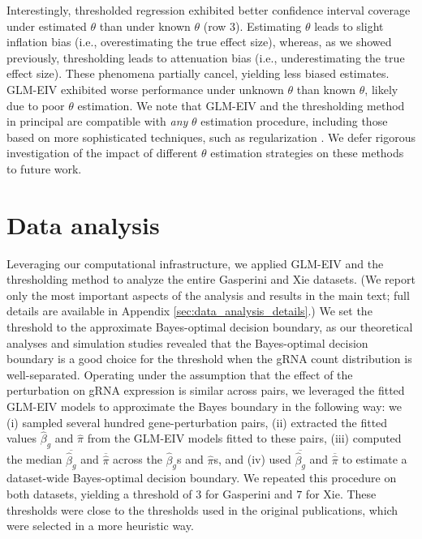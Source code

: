 \documentclass[12pt]{article}
\begin{document}
Interestingly, thresholded regression exhibited better confidence interval coverage under estimated $\theta$ than under known $\theta$ (row 3). Estimating $\theta$ leads to slight inflation bias (i.e., overestimating the true effect size), whereas, as we showed previously, thresholding leads to attenuation bias (i.e., underestimating the true effect size). These phenomena partially cancel, yielding less biased estimates. GLM-EIV exhibited worse performance under unknown $\theta$ than known $\theta$, likely due to poor $\theta$ estimation. We note that GLM-EIV and the thresholding method in principal are compatible with \textit{any} $\theta$ estimation procedure, including those based on more sophisticated techniques, such as regularization \cite{Hafemeister2019}. We defer rigorous investigation of the impact of different $\theta$ estimation strategies on these methods to future work.

\section{Data analysis}

Leveraging our computational infrastructure, we applied GLM-EIV and the thresholding method to analyze the entire Gasperini and Xie datasets. (We report only the most important aspects of the analysis and results in the main text; full details are available in Appendix \ref{sec:data_analysis_details}.) We set the threshold to the approximate Bayes-optimal decision boundary, as our theoretical analyses and simulation studies revealed that the Bayes-optimal decision boundary is a good choice for the threshold when the gRNA count distribution is well-separated. Operating under the assumption that the effect of the perturbation on gRNA expression is similar across pairs, we leveraged the fitted GLM-EIV models to approximate the Bayes boundary in the following way: we (i) sampled several hundred gene-perturbation pairs, (ii) extracted the fitted values $\hat{\beta}_g$ and $\hat{\pi}$ from the GLM-EIV models fitted to these pairs, (iii) computed the median $\overline{\hat{\beta}_g}$ and $\overline{\hat{\pi}}$ across the $\hat{\beta}_g$s and $\hat{\pi}$s, and (iv) used $\overline{\hat{\beta}_g}$ and $\overline{\hat{\pi}}$ to estimate a dataset-wide Bayes-optimal decision boundary. We repeated this procedure on both datasets, yielding a threshold of $3$ for Gasperini and $7$ for Xie. These thresholds were close to the thresholds used in the original publications, which were selected in a more heuristic way.
\end{document}

